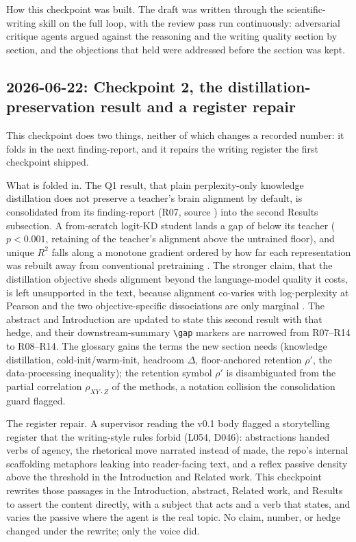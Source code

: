 How this checkpoint was built.
The draft was written through the scientific-writing skill on the full loop, with the review pass run continuously: adversarial critique agents argued against the reasoning and the writing quality section by section, and the objections that held were addressed before the section was kept.

\subsection*{2026-06-22: Checkpoint 2, the distillation-preservation result and a register repair}

This checkpoint does two things, neither of which changes a recorded number: it folds in the next finding-report, and it repairs the writing register the first checkpoint shipped.

What is folded in.
The Q1 result, that plain perplexity-only knowledge distillation does not preserve a teacher's brain alignment by default, is consolidated from its finding-report (R07, source ) into the second Results subsection.
A from-scratch logit-KD student lands a gap of  below its teacher ($p<0.001$, retaining  of the teacher's alignment above the untrained floor), and unique $R^2$ falls along a monotone gradient ordered by how far each representation was rebuilt away from conventional pretraining .
The stronger claim, that the distillation objective sheds alignment beyond the language-model quality it costs, is left unsupported in the text, because alignment co-varies with log-perplexity at Pearson  and the two objective-specific dissociations are only marginal .
The abstract and Introduction are updated to state this second result with that hedge, and their downstream-summary \verb|\gap| markers are narrowed from R07--R14 to R08--R14.
The glossary gains the terms the new section needs (knowledge distillation, cold-init/warm-init, headroom $\Delta$, floor-anchored retention $\rho'$, the data-processing inequality); the retention symbol $\rho'$ is disambiguated from the partial correlation $\rho_{XY\cdot Z}$ of the methods, a notation collision the consolidation guard flagged.

The register repair.
A supervisor reading the v0.1 body flagged a storytelling register that the writing-style rules forbid (L054, D046): abstractions handed verbs of agency, the rhetorical move narrated instead of made, the repo's internal scaffolding metaphors leaking into reader-facing text, and a reflex passive density above the threshold in the Introduction and Related work.
This checkpoint rewrites those passages in the Introduction, abstract, Related work, and Results to assert the content directly, with a subject that acts and a verb that states, and varies the passive where the agent is the real topic.
No claim, number, or hedge changed under the rewrite; only the voice did.

